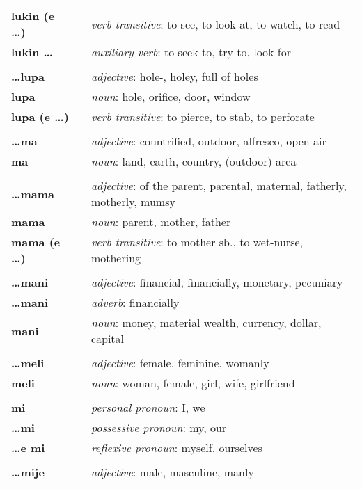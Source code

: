 \begin{supertabular}{p{2,5cm}|ll}
\textbf{lukin (e \dots)} && \textit{verb transitive}: to see, to look at, to watch, to read \\ 
\textbf{lukin \dots} && \textit{auxiliary verb}: to seek to, try to, look for \\ 
 && \\ %
\textbf{\dots lupa} && \textit{adjective}: hole-, holey, full of holes \\ 
\textbf{lupa} && \textit{noun}: hole, orifice, door, window \\ 
\textbf{lupa (e \dots)} && \textit{verb transitive}: to pierce, to stab, to perforate \\ 
 && \\ %
\textbf{\dots ma} && \textit{adjective}: countrified, outdoor, alfresco, open-air \\ 
\textbf{ma} && \textit{noun}: land, earth, country, (outdoor) area \\ 
 && \\ %
\textbf{\dots mama} && \textit{adjective}: of the parent, parental, maternal, fatherly, motherly, mumsy \\ 
\textbf{mama} && \textit{noun}: parent, mother, father \\ 
\textbf{mama (e \dots)} && \textit{verb transitive}: to mother sb., to wet-nurse, mothering \\ 
 && \\ %
\textbf{\dots mani} && \textit{adjective}: financial, financially, monetary, pecuniary \\ 
\textbf{\dots mani} && \textit{adverb}: financially \\ 
\textbf{mani} && \textit{noun}: money, material wealth, currency, dollar, capital \\ 
 && \\ %
\textbf{\dots meli} && \textit{adjective}: female, feminine, womanly \\ 
\textbf{meli} && \textit{noun}: woman, female, girl, wife, girlfriend \\ 
 && \\ %
\textbf{mi} && \textit{personal pronoun}: I, we  \\ 
\textbf{\dots mi} && \textit{possessive pronoun}: my, our \\  
\textbf{\dots e mi} && \textit{reflexive pronoun}: myself, ourselves  \\ 
 && \\ %
\textbf{\dots mije} && \textit{adjective}: male, masculine, manly \\ 

\end{supertabular}
